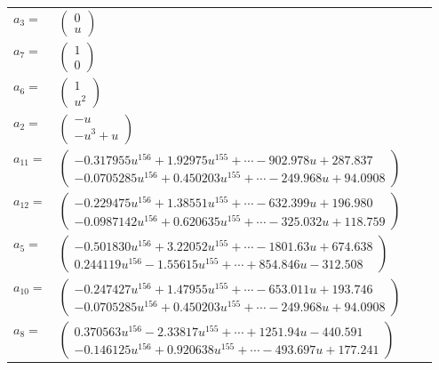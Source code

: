 \documentclass[1p]{elsarticle_modified}
\theoremstyle{definition}
\begin{document}
\begin{tabular}{m{7pt} m{180pt} m{7pt} m{180pt} }
\flushright $a_{3}=$&$\begin{pmatrix}0\\u\end{pmatrix}$ \\
\flushright $a_{7}=$&$\begin{pmatrix}1\\0\end{pmatrix}$ \\
\flushright $a_{6}=$&$\begin{pmatrix}1\\u^2\end{pmatrix}$ \\
\flushright $a_{2}=$&$\begin{pmatrix}- u\\- u^3+u\end{pmatrix}$ \\
\flushright $a_{11}=$&$\begin{pmatrix}-0.317955 u^{156}+1.92975 u^{155}+\cdots-902.978 u+287.837\\-0.0705285 u^{156}+0.450203 u^{155}+\cdots-249.968 u+94.0908\end{pmatrix}$ \\
\flushright $a_{12}=$&$\begin{pmatrix}-0.229475 u^{156}+1.38551 u^{155}+\cdots-632.399 u+196.980\\-0.0987142 u^{156}+0.620635 u^{155}+\cdots-325.032 u+118.759\end{pmatrix}$ \\
\flushright $a_{5}=$&$\begin{pmatrix}-0.501830 u^{156}+3.22052 u^{155}+\cdots-1801.63 u+674.638\\0.244119 u^{156}-1.55615 u^{155}+\cdots+854.846 u-312.508\end{pmatrix}$ \\
\flushright $a_{10}=$&$\begin{pmatrix}-0.247427 u^{156}+1.47955 u^{155}+\cdots-653.011 u+193.746\\-0.0705285 u^{156}+0.450203 u^{155}+\cdots-249.968 u+94.0908\end{pmatrix}$ \\
\flushright $a_{8}=$&$\begin{pmatrix}0.370563 u^{156}-2.33817 u^{155}+\cdots+1251.94 u-440.591\\-0.146125 u^{156}+0.920638 u^{155}+\cdots-493.697 u+177.241\end{pmatrix}$ \\

\end{tabular}
\end{document}
